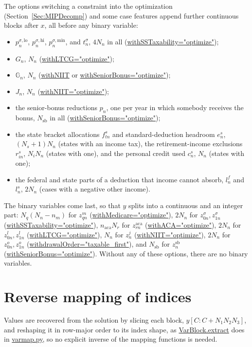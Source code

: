 \documentclass[fleqn,12pt]{report}
\newcommand{\code}[1]{\url{#1}}
\begin{document}
The options switching a constraint into the optimization (Section~\ref{Sec:MIPDecomp}) and
some case features append further continuous blocks after $x$, all before any binary variable:
\begin{itemize}
	\item $p^{\sigma,\mathrm{lo}}_n$, $p^{\sigma,\mathrm{hi}}_n$, $p^{\sigma,\mathrm{min}}_n$, and $t^\sigma_n$,
	$4N_n$ in all (\code{withSSTaxability="optimize"});
	\item $G_n$, $N_n$ (\code{withLTCG="optimize"});
	\item $\mathbb{G}_n$, $N_n$ (\code{withNIIT} or \code{withSeniorBonus="optimize"});
	\item $J_n$, $N_n$ (\code{withNIIT="optimize"});
	\item the senior-bonus reductions $p_n$, one per year in which somebody receives the bonus,
	$N_{\mathrm{sb}}$ in all (\code{withSeniorBonus="optimize"});
	\item the state bracket allocations $f^s_{tn}$ and standard-deduction headroom $e^s_n$,
	$(N_s + 1)N_n$ (states with an income tax), the retirement-income exclusions $r^{s}_{in}$,
	$N_iN_n$ (states with one), and the personal credit used $c^{s}_n$, $N_n$ (states with one);
	\item the federal and state parts of a deduction that income cannot absorb, $l^f_n$ and $l^s_n$,
	$2N_n$ (cases with a negative other income).
\end{itemize}
The binary variables come last, so that $y$ splits into a continuous and an integer part:
$N_q(N_n - n_m)$ for $z^m_{qn}$ (\code{withMedicare="optimize"}),
$2N_n$ for $z^\sigma_{0n},z^\sigma_{1n}$ (\code{withSSTaxability="optimize"}),
$n_{\mathrm{aca}}N_r$ for $z^{\mathrm{aca}}_{rn}$ (\code{withACA="optimize"}),
$2N_n$ for $z^l_{0n},z^l_{1n}$ (\code{withLTCG="optimize"}),
$N_n$ for $z^j_n$ (\code{withNIIT="optimize"}),
$2N_n$ for $z^o_{0n},z^o_{1n}$ (\code{withdrawalOrder="taxable_first"}), and
$N_{\mathrm{sb}}$ for $z^{\mathrm{sb}}_n$ (\code{withSeniorBonus="optimize"}).
Without any of these options, there are no binary variables.

\section{Reverse mapping of indices}
Values are recovered from the solution by slicing each block, $y[C : C + N_1N_2N_3]$, and
reshaping it in row-major order to its index shape, as \code{VarBlock.extract} does in
\code{varmap.py}, so no explicit inverse of the mapping functions is needed.
\end{document}
